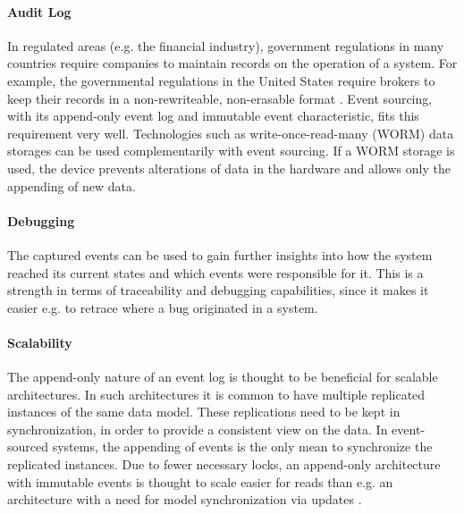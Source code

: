 \paragraph{Audit Log}{
In regulated areas (e.g. the financial industry), government regulations in 
many countries require companies to maintain records on the operation of a 
system. For example, the governmental regulations in the United States require 
brokers to keep their records in a non-rewriteable, non-erasable format \cite{sec17a}.
Event sourcing, with its append-only event log and immutable event characteristic, 
fits this requirement very well. Technologies such as write-once-read-many (WORM) 
data storages can be used complementarily with event sourcing.
If a WORM storage is used, the device prevents alterations of data in the hardware 
and allows only the appending of new data. 
}

\paragraph{Debugging}{
The captured events can be used to gain further insights into how the system 
reached its current states and which events were responsible for it. This is 
a strength in terms of traceability and debugging capabilities, since it makes 
it easier e.g. to retrace where a bug originated in a system.
}

\paragraph{Scalability}{
The append-only nature of an event log is thought to be beneficial for scalable 
architectures.
%
In such architectures it is common to have multiple replicated instances of the
same data model. These replications need to be kept in synchronization, in order 
to provide a consistent view on the data.
In event-sourced systems, the appending of events is the only mean to synchronize 
the replicated instances.
Due to fewer necessary locks, an append-only architecture with immutable events 
is thought to scale easier for reads than e.g. an architecture with a need for 
model synchronization via updates \cite[p.14-15]{Anderson2010}\cite{esdocs}.
}

